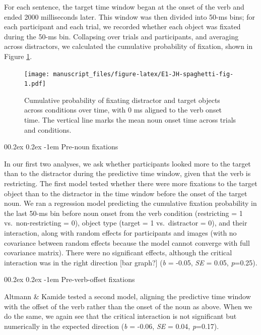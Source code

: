 \documentclass[
  man,floatsintext]{apa6}
\makeatletter
\let\oldparagraph\paragraph
\renewcommand{\paragraph}[1]{\oldparagraph{#1}\mbox{}}
\renewcommand{\paragraph}{\@startsection{paragraph}{4}{\parindent}%
  {0\baselineskip \@plus 0.2ex \@minus 0.2ex}%
  {-1em}%
  {\normalfont\normalsize\bfseries\itshape\typesectitle}}
\makeatother
\begin{document}
For each sentence, the target time window began at the onset of the verb and ended 2000 milliseconds later. This window was then divided into 50-ms bins; for each participant and each trial, we recorded whether each object was fixated during the 50-ms bin. Collapsing over trials and participants, and averaging across distractors, we calculated the cumulative probability of fixation, shown in Figure \ref{fig:E1-JH-spaghetti-fig}.

\begin{figure}
\centering
\texttt{[image: manuscript\_files/figure-latex/E1-JH-spaghetti-fig-1.pdf]}
\caption{\label{fig:E1-JH-spaghetti-fig}Cumulative probability of fixating distractor and target objects across conditions over time, with 0 ms aligned to the verb onset time. The vertical line marks the mean noun onset time across trials and conditions.}
\end{figure}

\hypertarget{pre-noun-fixations-1}{%
\paragraph{Pre-noun fixations}\label{pre-noun-fixations-1}}

In our first two analyses, we ask whether participants looked more to the target than to the distractor during the predictive time window, given that the verb is restricting. The first model tested whether there were more fixations to the target object than to the distractor in the time window before the onset of the target noun. We ran a regression model predicting the cumulative fixation probability in the last 50-ms bin before noun onset from the verb condition (restricting = 1 vs.~non-restricting = 0), object type (target = 1 vs.~distractor = 0), and their interaction, along with random effects for participants and images (with no covariance between random effects because the model cannot converge with full covariance matrix). There were no significant effects, although the critical interaction was in the right direction {[}bar graph?{]} (\emph{b} = -0.05, \emph{SE} = 0.05, \emph{p}=0.25).

\hypertarget{pre-verb-offset-fixations-1}{%
\paragraph{Pre-verb-offset fixations}\label{pre-verb-offset-fixations-1}}

Altmann \& Kamide tested a second model, aligning the predictive time window with the offset of the verb rather than the onset of the noun as above. When we do the same, we again see that the critical interaction is not significant but numerically in the expected direction (\emph{b} = -0.06, \emph{SE} = 0.04, \emph{p}=0.17).
\end{document}
